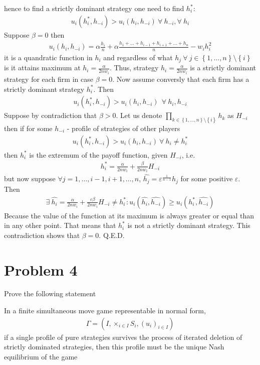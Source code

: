 \documentclass[a4paper]{article}
\begin{document}
hence to find a strictly dominant strategy one need to find $h_i^*$:
\begin{align*}
u_i(h_i^*, h_{-i}) > u_i(h_i, h_{-i})\ \forall\ h_{-i}, \forall\ h_i
\end{align*}
Suppose $\beta = 0$ then 
\begin{align*}
u_i(h_i, h_{-i}) = \alpha\frac{h_i}{n} + \alpha\frac{h_1 + \dots+h_{i-1}+h_{i+1}+\dots+h_n}{n} - w_ih_i^2
\end{align*}
it is a quandratic function in $h_i$ and regardless of what $h_j\ \forall\ j \in\left\{1, \dots, n\right\}\setminus \left\{i\right\}$ is it attains maximum at $h_i = \frac{\alpha}{2nw_i}$. Thus, strategy $h_i = \frac{\alpha}{2nw_i}$ is a strictly dominant strategy for each firm in case $\beta = 0$. Now assume conversly that each firm has a strictly dominant strategy $h_i^*$. Then 
\begin{align*}
u_i(h_i^*, h_{-i}) > u_i(h_i, h_{-i})\ \  \forall\ h_i, h_{-i}
\end{align*}
Suppose by contradiction that $\beta > 0$. Let us denote $\prod_{k \in \left\{1, \dots, n\right\}\setminus\left\{i\right\}}h_k$ as $H_{-i}$ then if for some $h_{-i}$ - profile of strategies of other players
\begin{align*}
u_i(h_i^*, h_{-i}) > u_i(h_i, h_{-i})\ \forall\ h_i \neq h_{i}^*
\end{align*}
then $h_{i}^*$ is the extremum of the payoff function, given $H_{-i}$, i.e.
\begin{align*}
h_i^* = \frac{\alpha}{2nw_i} + \frac{\beta}{2nw_i}H_{-i}
\end{align*}
but now suppose $\forall j = 1, \dots, i-1, i+1, \dots, n$, $\hat{h_j} = \varepsilon^{\frac{1}{n-1}}h_j$ for some positive $\varepsilon$. Then
\begin{align*}
\exists\ \hat{h_i} = \frac{\alpha}{2nw_i} + \frac{\varepsilon \beta}{2nw_i}H_{-i} \neq h^*_i: u_i(\hat{h_i}, \hat{h_{-i}}) \ge u_i(h_i^*, \hat{h_{-i}})
\end{align*}
Because the value of the function at its maximum is always greater or equal than in any other point. That means that $h_i^*$ is not a strictly dominant strategy. This contradiction shows that $\beta = 0$. Q.E.D.
\section*{Problem 4}
Prove the following statement



In a finite simultaneous move game representable in normal form,
\begin{align*}
\Gamma =
(I, \times_{i \in I}S_i,(u_i)_{i\in I})
\end{align*}
if a single profile of pure strategies survives the process of iterated deletion
of strictly dominated strategies, then this profile must be the unique Nash
equilibrium of the game
\end{document}
